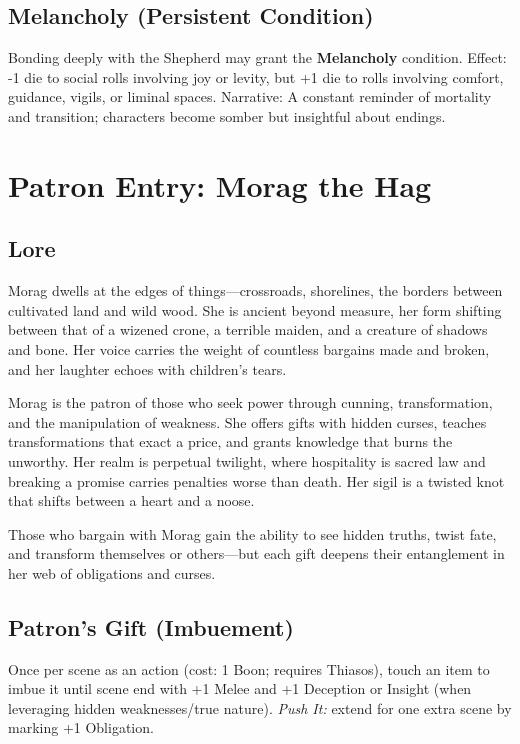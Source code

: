 \documentclass[11pt]{article}
\begin{document}
\subsection*{Melancholy (Persistent Condition)}
Bonding deeply with the Shepherd may grant the \textbf{Melancholy} condition.  
Effect: -1 die to social rolls involving joy or levity, but +1 die to rolls involving comfort, guidance, vigils, or liminal spaces.  
Narrative: A constant reminder of mortality and transition; characters become somber but insightful about endings.

\clearpage
\section{Patron Entry: Morag the Hag}
\label{patron:morag}

\subsection*{Lore}
Morag dwells at the edges of things---crossroads, shorelines, the borders between cultivated land and wild wood. She is ancient beyond measure, her form shifting between that of a wizened crone, a terrible maiden, and a creature of shadows and bone. Her voice carries the weight of countless bargains made and broken, and her laughter echoes with children's tears.  

Morag is the patron of those who seek power through cunning, transformation, and the manipulation of weakness. She offers gifts with hidden curses, teaches transformations that exact a price, and grants knowledge that burns the unworthy. Her realm is perpetual twilight, where hospitality is sacred law and breaking a promise carries penalties worse than death. Her sigil is a twisted knot that shifts between a heart and a noose.  

Those who bargain with Morag gain the ability to see hidden truths, twist fate, and transform themselves or others---but each gift deepens their entanglement in her web of obligations and curses.

\subsection*{Patron's Gift (Imbuement)}
Once per scene as an action (cost: 1 Boon; requires Thiasos), touch an item to imbue it until scene end with +1 Melee and +1 Deception or Insight (when leveraging hidden weaknesses/true nature). \emph{Push It:} extend for one extra scene by marking +1 Obligation.
\end{document}
